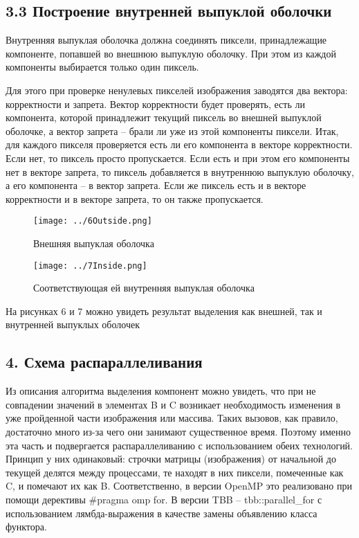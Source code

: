 \documentclass{report}
\begin{document}
\subsection*{ 3.3 Построение внутренней выпуклой оболочки}
\par Внутренняя выпуклая оболочка должна соединять пиксели, принадлежащие компоненте, попавшей во внешнюю выпуклую оболочку. При этом из каждой компоненты выбирается только один пиксель.
\par Для этого при проверке ненулевых пикселей изображения заводятся два вектора: корректности и запрета. Вектор корректности будет проверять, есть ли компонента, которой принадлежит текущий пиксель во внешней выпуклой оболочке, а вектор запрета – брали ли уже из этой компоненты пиксели. Итак, для каждого пикселя проверяется есть ли его компонента в векторе корректности. Если нет, то пиксель просто пропускается. Если есть и при этом его компоненты нет в векторе запрета, то пиксель добавляется в внутреннюю выпуклую оболочку, а его компонента – в вектор запрета. Если же пиксель есть и в векторе корректности и в векторе запрета, то он также пропускается.
\begin{figure}[htbp]
  \centering
  \texttt{[image: ../6Outside.png]}
  \caption{Внешняя выпуклая оболочка}\label{fig:../6Outside.png}
\end{figure}
\begin{figure}[htbp]
  \centering
  \texttt{[image: ../7Inside.png]}
  \caption{Соответствующая ей внутренняя выпуклая оболочка}\label{fig:../7Inside.png}
\end{figure}
\par На рисунках 6 и 7 можно увидеть результат выделения как внешней, так и внутренней выпуклых оболочек

\newpage


\begin{center}
\section*{4. Схема распараллеливания}
\end{center}
\par Из описания алгоритма выделения компонент можно увидеть, что при не совпадении значений в элементах B и C возникает необходимость изменения в уже пройденной части изображения или массива. Таких вызовов, как правило, достаточно много из-за чего они занимают существенное время. Поэтому именно эта часть и подвергается распараллеливанию с использованием обеих технологий. Принцип у них одинаковый: строчки матрицы (изображения) от начальной до текущей делятся между процессами, те находят в них пиксели, помеченные как C, и помечают их как B. Соответственно, в версии OpenMP это реализовано при помощи дерективы \#pragma omp for. В версии TBB – tbb::parallel\_for с использованием лямбда-выражения в качестве замены объявлению класса функтора.
\end{document}
